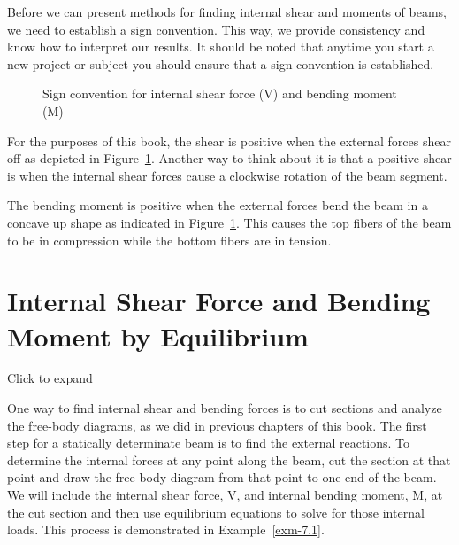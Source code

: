 \documentclass[
  letterpaper,
  DIV=11,
  numbers=noendperiod]{scrreprt}
\theoremstyle{definition}
\theoremstyle{remark}
\begin{document}
Before we can present methods for finding internal shear and moments of
beams, we need to establish a sign convention. This way, we provide
consistency and know how to interpret our results. It should be noted
that anytime you start a new project or subject you should ensure that a
sign convention is established.

\begin{figure}


\caption{\label{fig-7.2}Sign convention for internal shear force (V) and
bending moment (M)}

\end{figure}%

For the purposes of this book, the shear is positive when the external
forces shear off as depicted in Figure~\ref{fig-7.2}. Another way to
think about it is that a positive shear is when the internal shear
forces cause a clockwise rotation of the beam segment.

The bending moment is positive when the external forces bend the beam in
a concave up shape as indicated in Figure~\ref{fig-7.2}. This causes the
top fibers of the beam to be in compression while the bottom fibers are
in tension.

\section{Internal Shear Force and Bending Moment by
Equilibrium}\label{sec-7.1}

Click to expand

One way to find internal shear and bending forces is to cut sections and
analyze the free-body diagrams, as we did in previous chapters of this
book. The first step for a statically determinate beam is to find the
external reactions. To determine the internal forces at any point along
the beam, cut the section at that point and draw the free-body diagram
from that point to one end of the beam. We will include the internal
shear force, V, and internal bending moment, M, at the cut section and
then use equilibrium equations to solve for those internal loads. This
process is demonstrated in Example~\ref{exm-7.1}.
\end{document}
